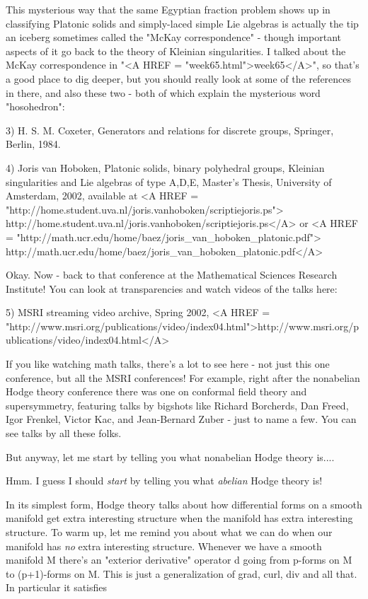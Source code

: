 This mysterious way that the same Egyptian fraction problem shows up
in classifying Platonic solids and simply-laced simple Lie algebras is 
actually the tip an iceberg sometimes called the "McKay 
correspondence" - 
though important aspects of it go back to the theory of Kleinian
singularities.  I talked about the McKay correspondence in 
"<A HREF = "week65.html">week65</A>", so that's a good
place to dig deeper, but you should really look at some of the
references in there, and also these two - both of which
explain the mysterious word "hosohedron":

3) H. S. M. Coxeter, Generators and relations for discrete groups,
Springer, Berlin, 1984.

4) Joris van Hoboken, Platonic solids, binary polyhedral groups,
Kleinian singularities and Lie algebras of type A,D,E, Master's
Thesis, University of Amsterdam, 2002, available at
<A HREF = "http://home.student.uva.nl/joris.vanhoboken/scriptiejoris.ps">
http://home.student.uva.nl/joris.vanhoboken/scriptiejoris.ps</A> or
<A HREF = "http://math.ucr.edu/home/baez/joris_van_hoboken_platonic.pdf">
http://math.ucr.edu/home/baez/joris_van_hoboken_platonic.pdf</A>

Okay.  Now - back to that conference at the Mathematical Sciences
Research Institute!  You can look at transparencies and watch videos 
of the talks here:

5) MSRI streaming video archive, Spring 2002, 
<A HREF = "http://www.msri.org/publications/video/index04.html">http://www.msri.org/publications/video/index04.html</A>

If you like watching math talks, there's a lot to see here - not just
this one conference, but all the MSRI conferences!  For example, right
after the nonabelian Hodge theory conference there was one on conformal
field theory and supersymmetry, featuring talks by bigshots like Richard
Borcherds, Dan Freed, Igor Frenkel, Victor Kac, and Jean-Bernard Zuber -
just to name a few.  You can see talks by all these folks.

But anyway, let me start by telling you what nonabelian Hodge theory is....

Hmm.  I guess I should \emph{start} by telling you what
\emph{abelian} Hodge theory is!

In its simplest form, Hodge theory talks about how differential forms on
a smooth manifold get extra interesting structure when the manifold has
extra interesting structure.  To warm up, let me remind you about what
we can do when our manifold has \emph{no} extra interesting structure.
Whenever we have a smooth manifold M there's an "exterior derivative"
operator d going from p-forms on M to (p+1)-forms on M.  This is just a
generalization of grad, curl, div and all that.  In particular it
satisfies

